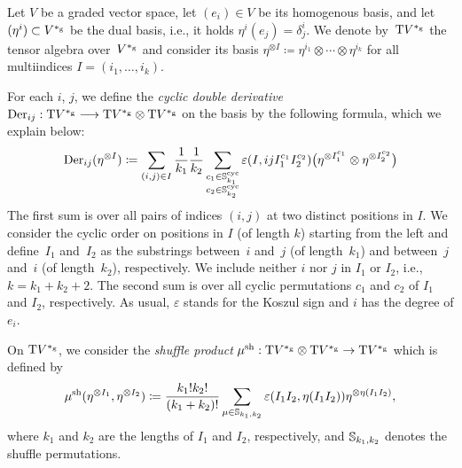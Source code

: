\documentclass[\MainFolder/Text.tex]{subfiles}
\begin{document}
\begin{Definition}\label{Def:DefOfHochOp}
Let $V$ be a graded vector space, let $(e_i)\in V$ be its homogenous basis, and let $(\eta^i)\subset V^{*_{\mathrm{g}}}$ be the dual basis, i.e., it holds $\eta^i(e_j) = \delta^i_j$. We denote by~$\mathrm{T} V^{*_{\mathrm{g}}}$ the tensor algebra over~$V^{*_{\mathrm{g}}}$ and consider its basis $\eta^{\otimes I} \coloneqq \eta^{i_1} \otimes \dotsb \otimes \eta^{i_k}$ for all multiindices $I = (i_1,\dotsc,i_k)$.

For each $i$, $j$, we define the \emph{cyclic double derivative} $\mathrm{Der}_{ij}:\mathrm{T}  V^{*_{\mathrm{g}}} \longrightarrow \mathrm{T} V^{*_{\mathrm{g}}} \otimes \mathrm{T} V^{*_{\mathrm{g}}}$ on the basis by the following formula, which we explain below:
\begin{equation}\label{Eq:DoubleDeriv}
\mathrm{Der}_{ij}(\eta^{\otimes I}) \coloneqq \sum_{(i,j)\in I} \frac{1}{k_1}\frac{1}{k_2}\sum_{\substack{c_1 \in \mathbb{S}^{\mathrm{cyc}}_{k_1}\\ c_2 \in \mathbb{S}^{\mathrm{cyc}}_{k_2}}} \varepsilon(I,ijI_1^{c_1}I_2^{c_2}) \bigl(\eta^{\otimes I_1^{c_1}} \otimes \eta^{\otimes I_2^{c_2}}\bigr)
\end{equation}
The first sum is over all pairs of indices $(i,j)$ at two distinct positions in $I$. We consider the cyclic order on positions in $I$ (of length $k$) starting from the left and define~$I_1$ and~$I_2$ as the substrings between~$i$ and~$j$ (of length~$k_1$) and between~$j$ and~$i$ (of length~$k_2$), respectively. We include neither $i$ nor $j$ in $I_1$ or $I_2$, i.e., $k= k_1 + k_2 + 2$. The second sum is over all cyclic permutations $c_1$ and $c_2$ of $I_1$ and $I_2$, respectively. As usual, $\varepsilon$ stands for the Koszul sign and $i$ has the degree of $e_i$. 

On $\mathrm{T} V^{*_{\mathrm{g}}}$, we consider the \emph{shuffle product} $\mu^{\mathrm{sh}}: \mathrm{T} V^{*_{\mathrm{g}}}\otimes\mathrm{T} V^{*_{\mathrm{g}}} \rightarrow \mathrm{T} V^{*_{\mathrm{g}}}$ which is defined by
$$ \mu^{\mathrm{sh}}(\eta^{\otimes I_1},\eta^{\otimes I_2}) \coloneqq \frac{k_1! k_2!}{(k_1 + k_2)!} \sum_{\mu\in\mathbb{S}_{k_1,k_2}} \varepsilon(I_1 I_2, \eta(I_1 I_2)) \eta^{\otimes\eta(I_1 I_2)}, $$
where $k_1$ and $k_2$ are the lengths of $I_1$ and $I_2$, respectively, and $\mathbb{S}_{k_1,k_2}$ denotes the shuffle permutations.


\end{Definition}
\end{document}
